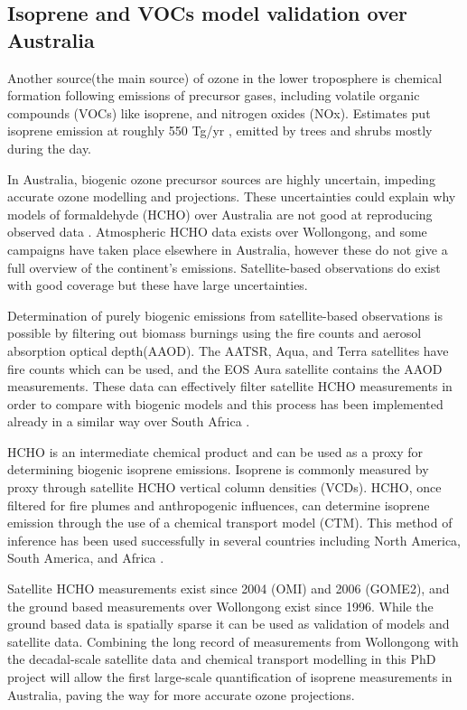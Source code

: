 \subsection{Isoprene and VOCs model validation over Australia}
Another source(the main source) of ozone in the lower troposphere is chemical formation following emissions of precursor gases, including volatile organic compounds (VOCs) like isoprene, and nitrogen oxides (NOx).
Estimates put isoprene emission at roughly 550 Tg/yr \cite{Guenther_2006, Monks_2014}, emitted by trees and shrubs mostly during the day.

In Australia, biogenic ozone precursor sources are highly uncertain, impeding accurate ozone modelling and projections. These uncertainties could explain why models of formaldehyde (HCHO) over Australia are not good at reproducing observed data \cite{Stavrakou_2009}. Atmospheric HCHO data exists over Wollongong, and some campaigns have taken place elsewhere in Australia, however these do not give a full overview of the continent's emissions. Satellite-based observations do exist with good coverage but these have large uncertainties. 

Determination of purely biogenic emissions from satellite-based observations is possible by filtering out biomass burnings using the fire counts and aerosol absorption optical depth(AAOD). The AATSR, Aqua, and Terra satellites have fire counts which can be used, and the EOS Aura satellite contains the AAOD measurements. These data can effectively filter satellite HCHO measurements in order to compare with biogenic models and this process has been implemented already in a similar way over South Africa \cite{Marais_2012}.

HCHO is an intermediate chemical product and can be used as a proxy for determining biogenic isoprene emissions. 
Isoprene is commonly measured by proxy through satellite HCHO vertical column densities (VCDs). HCHO, once filtered for fire plumes and anthropogenic influences, can determine isoprene emission through the use of a chemical transport model (CTM).
This method of inference has been used successfully in several countries including North America\cite{Palmer_2003}, South America\cite{Barkley_2013}, and Africa \cite{Marais_2012}.

Satellite HCHO measurements exist since 2004 (OMI) and 2006 (GOME2), and the ground based measurements over Wollongong exist since 1996. While the ground based data is spatially sparse it can be used as validation of models and satellite data. Combining the long record of measurements from Wollongong with the decadal-scale satellite data and chemical transport modelling in this PhD project will allow the first large-scale quantification of isoprene measurements in Australia, paving the way for more accurate ozone projections.

  